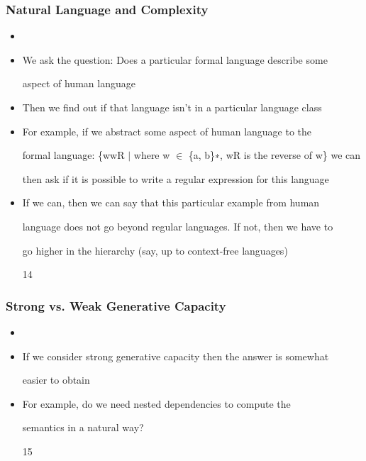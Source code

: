\documentclass[compress,color=usenames]{beamer}
\begin{document}
\begin{frame}
\frametitle{Natural Language and Complexity}


\begin{itemize}
\item



\item We ask the question: Does a particular formal language describe some


aspect of human language





\item Then we ﬁnd out if that language isn't in a particular language class


\item For example, if we abstract some aspect of human language to the


formal language: \{wwR $\mid$ where w $\in$ \{a, b\}∗, wR is the reverse of w\} we can


then ask if it is possible to write a regular expression for this language





\item If we can, then we can say that this particular example from human


language does not go beyond regular languages. If not, then we have to


go higher in the hierarchy (say, up to context-free languages)


14




\end{itemize}

\end{frame}

\begin{frame}
\frametitle{Strong vs. Weak Generative Capacity}

\begin{itemize}
\item




\item If we consider strong generative capacity then the answer is somewhat


easier to obtain





\item For example, do we need nested dependencies to compute the


semantics in a natural way?





15




\end{itemize}

\end{frame}
\end{document}
